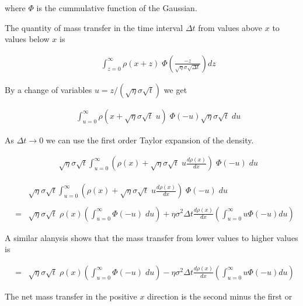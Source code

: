 {{\vfill
where $\Phi$ is the cummulative function of the Gaussian.
}

{\Large

The quantity of mass transfer in the time interval $\Delta t$ from values above $x$ to values below $x$ is


\begin{eqnarray*}
&  & \int_{z = 0}^\infty \rho(x+z)\;\Phi\left(\frac{-z}{\sqrt{\eta}\sigma\sqrt{\Delta t}}\right) dz
\end{eqnarray*}

By a change of variables $u = z/(\sqrt{\eta}\sigma\sqrt{t})$ we get

\begin{eqnarray*}
&  & \int_{u = 0}^\infty \rho(x+\sqrt{\eta}\sigma\sqrt{t}\;u)\;\Phi(-u) \sqrt{\eta}\sigma\sqrt{t}\;du
\end{eqnarray*}

\vfill
As $\Delta t \rightarrow 0$ we can use the first order Taylor expansion of the density.

\begin{eqnarray*}
&  & \sqrt{\eta}\sigma\sqrt{t} \int_{u = 0}^\infty \left(\rho(x)+\sqrt{\eta}\sigma\sqrt{t}\;u \frac{d\rho(x)}{dx}\right)\;\Phi(-u)\;du
\end{eqnarray*}
}

{\Large

\begin{eqnarray*}
&  & \sqrt{\eta}\sigma\sqrt{t} \int_{u = 0}^\infty \left(\rho(x)+\sqrt{\eta}\sigma\sqrt{t}\;u \frac{d\rho(x)}{dx}\right)\;\Phi(-u)\;du \\
\\
& = & \sqrt{\eta}\sigma\sqrt{t}\;\rho(x)\left(\int_{u=0}^\infty \Phi(-u)\;du\right) +  \eta\sigma^2\Delta t \frac{d\rho(x)}{dx} \left(\int_{u=0}^\infty u\Phi(-u) du\right)
\end{eqnarray*}

A similar alanysis shows that the mass transfer from lower values to higher values is

\begin{eqnarray*}
& = & \sqrt{\eta}\sigma\sqrt{t}\;\rho(x)\left(\int_{u=0}^\infty \Phi(-u)\;du\right) -  \eta\sigma^2\Delta t \frac{d\rho(x)}{dx} \left(\int_{u=0}^\infty u\Phi(-u) du\right)
\end{eqnarray*}

\vfill
The net mass transfer in the positive $x$ direction is the second minus the first or

}}
